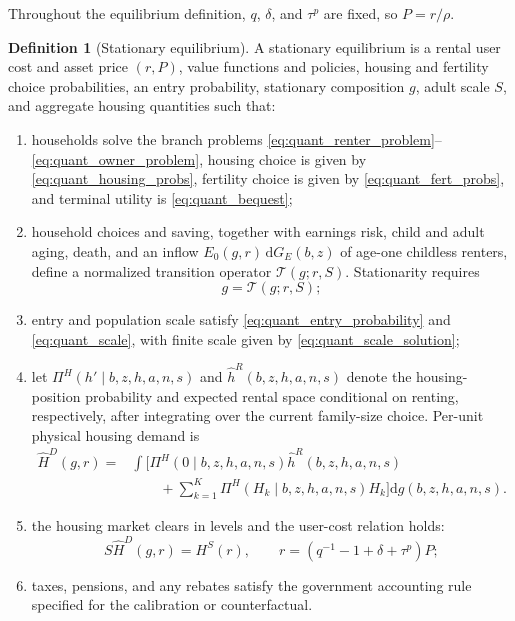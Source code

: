 \documentclass[11pt]{article}
\theoremstyle{definition}
\newtheorem{definition}{Definition}
\newcommand{\dd}{\mathrm d}
\newcommand{\1}{\mathbf 1}
\begin{document}
Throughout the equilibrium definition, $q$, $\delta$, and $\tau^p$ are fixed,
so $P=r/\rho$.

\begin{definition}[Stationary equilibrium]
A stationary equilibrium is a rental user cost and asset price $(r,P)$, value
functions and policies, housing and fertility choice probabilities, an entry
probability, stationary composition $g$, adult scale $S$, and aggregate housing
quantities such that:
\begin{enumerate}
\item households solve the branch problems
\eqref{eq:quant_renter_problem}--\eqref{eq:quant_owner_problem}, housing choice
is given by \eqref{eq:quant_housing_probs}, fertility choice is given by
\eqref{eq:quant_fert_probs}, and terminal utility is \eqref{eq:quant_bequest};
\item household choices and saving, together with earnings risk, child and adult
aging, death, and an inflow $E_0(g,r)\,\dd G_E(b,z)$ of age-one childless
renters, define a normalized transition operator $\mathcal T(g;r,S)$.
Stationarity requires
\begin{equation}
g=\mathcal T(g;r,S);
\label{eq:quant_stationary_distribution}
\end{equation}
\item entry and population scale satisfy \eqref{eq:quant_entry_probability}
and \eqref{eq:quant_scale}, with finite scale given by
\eqref{eq:quant_scale_solution};
\item let $\Pi^H(h'\mid b,z,h,a,n,s)$ and
$\widehat h^R(b,z,h,a,n,s)$ denote the housing-position probability and
expected rental space conditional on renting, respectively, after integrating
over the current family-size choice. Per-unit physical housing demand is
\begin{equation}
\begin{aligned}
\widehat H^D(g,r)
={}&
\int
\Bigg[
\Pi^H(0\mid b,z,h,a,n,s)\widehat h^R(b,z,h,a,n,s)\\
&\qquad
+\sum_{k=1}^K\Pi^H(H_k\mid b,z,h,a,n,s)H_k
\Bigg]\dd g(b,z,h,a,n,s).
\end{aligned}
\label{eq:quant_hd}
\end{equation}
\item the housing market clears in levels and the user-cost relation holds:
\begin{equation}
S\widehat H^D(g,r)=H^S(r),
\qquad
r=(q^{-1}-1+\delta+\tau^p)P;
\label{eq:quant_clearing}
\end{equation}
\item taxes, pensions, and any rebates satisfy the government accounting rule
specified for the calibration or counterfactual.
\end{enumerate}
\end{definition}
\end{document}
